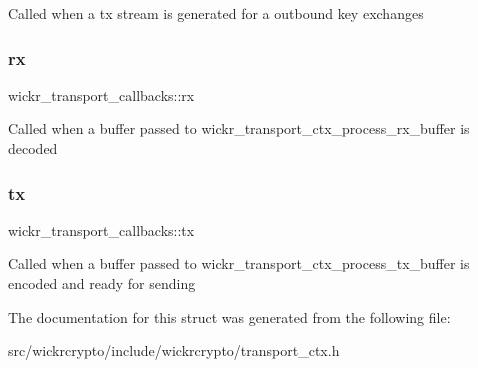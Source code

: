 Called when a tx stream is generated for a outbound key exchanges \mbox{\label{structwickr__transport__callbacks_a5d523402980ac09fdf52aa4824f8e9f7}} 
\subsubsection{\texorpdfstring{rx}{rx}}
{\footnotesize\ttfamily wickr\+\_\+transport\+\_\+callbacks\+::rx}

Called when a buffer passed to wickr\+\_\+transport\+\_\+ctx\+\_\+process\+\_\+rx\+\_\+buffer is decoded \mbox{\label{structwickr__transport__callbacks_a06c4b21b847c00e92373cf1402e1cb9d}} 
\subsubsection{\texorpdfstring{tx}{tx}}
{\footnotesize\ttfamily wickr\+\_\+transport\+\_\+callbacks\+::tx}

Called when a buffer passed to wickr\+\_\+transport\+\_\+ctx\+\_\+process\+\_\+tx\+\_\+buffer is encoded and ready for sending 

The documentation for this struct was generated from the following file\+:\begin{DoxyCompactItemize}
\item 
src/wickrcrypto/include/wickrcrypto/transport\+\_\+ctx.\+h\end{DoxyCompactItemize}
